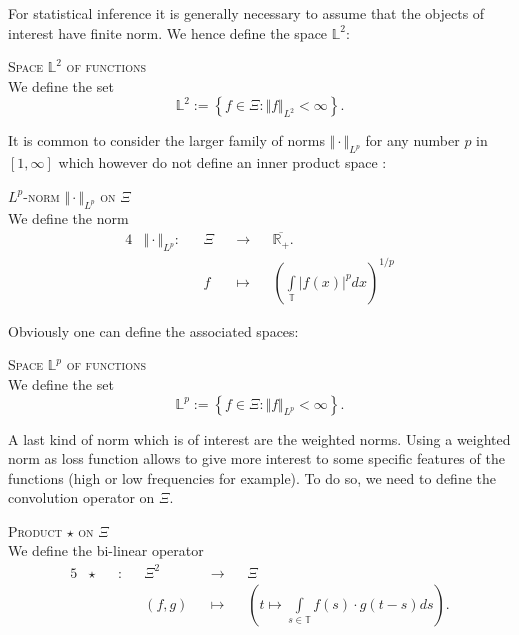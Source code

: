 \begin{Liste}[]
For statistical inference it is generally necessary to assume that the objects of interest have finite norm.
We hence define the space $\mathds{L}^{2}$:
\begin{de}{\textsc{Space $\mathds{L}^{2}$ of functions}\\}\label{DE_INTRO_FREQ_SPACEL2XI}
We define the set
\[\mathds{L}^{2} := \left\{f \in \Xi : \Vert f \Vert_{L^{2}} < \infty \right\}.\]
\end{de}

It is common to consider the larger family of norms $\Vert \cdot \Vert_{L^{p}}$ for any number $p$ in $[1, \infty]$ which however do not define an inner product space :
\begin{de}{\textsc{$L^{p}$-norm $\Vert \cdot \Vert_{L^{p}}$ on $\Xi$}\\}\label{DE_INTRO_FREQ_LPXI}
We define the norm
\begin{alignat*}{4}
& \Vert \cdot \Vert_{L^{p}} : && \Xi && \rightarrow && \overline{\mathds{R}_{+}}.\\
& && f && \mapsto && \left(\int\limits_{\mathds{T}} \vert f(x)\vert^{p} dx\right)^{1/p}
\end{alignat*}
\end{de}

Obviously one can define the associated spaces:
\begin{de}{\textsc{Space $\mathds{L}^{p}$ of functions}\\}\label{DE_INTRO_FREQ_SPACELPXI}
We define the set
\[\mathds{L}^{p} := \left\{f \in \Xi : \Vert f \Vert_{L^{p}} < \infty \right\}.\]
\end{de}

A last kind of norm which is of interest are the weighted norms.
Using a weighted norm as loss function allows to give more interest to some specific features of the functions (high or low frequencies for example).
To do so, we need to define the convolution operator on $\Xi$.

\begin{de}{\textsc{Product $\star$ on $\Xi$}\\}\label{DE_INTRO_FREQ_CONVOLXI}
We define the bi-linear operator
\begin{alignat*}{5}
& \star && : && \Xi^{2} && \rightarrow && \Xi \\
& && && (f, g) && \mapsto && \left(t \mapsto \int\limits_{s \in \mathds{T}} f(s) \cdot g(t-s) ds\right).
\end{alignat*}
\end{de}


\end{Liste}

